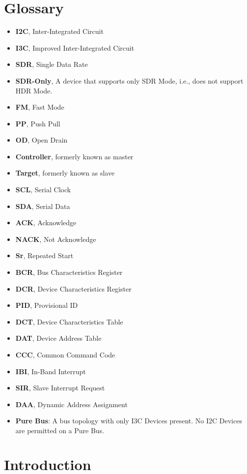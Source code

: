\documentclass[main\_\_EN.tex]{subfiles}
\begin{document}
\section{Glossary}
\setlength{\itemsep}{3pt}
\begin{itemize}
    \item \textbf{I2C}, Inter-Integrated Circuit
    \item \textbf{I3C}, Improved Inter-Integrated Circuit
    \item \textbf{SDR}, Single Data Rate
    \item \textbf{SDR-Only}, A device that supports only SDR Mode, i.e., does not support HDR Mode.
    \item \textbf{FM}, Fast Mode
    \item \textbf{PP}, Push Pull
    \item \textbf{OD}, Open Drain
    \item \textbf{Controller}, formerly known as master
    \item \textbf{Target}, formerly known as slave
    \item \textbf{SCL}, Serial Clock
    \item \textbf{SDA}, Serial Data
    \item \textbf{ACK}, Acknowledge
    \item \textbf{NACK}, Not Acknowledge
    \item \textbf{Sr}, Repeated Start
    \item \textbf{BCR}, Bus Characteristics Register
    \item \textbf{DCR}, Device Characteristics Register
    \item \textbf{PID}, Provisional ID
    \item \textbf{DCT}, Device Characteristics Table
    \item \textbf{DAT}, Device Address Table
    \item \textbf{CCC}, Common Command Code
    \item \textbf{IBI}, In-Band Interrupt
    \item \textbf{SIR}, Slave Interrupt Request
    \item \textbf{DAA}, Dynamic Address Assignment
    \item \textbf{Pure Bus}: A bus topology with only I3C Devices present. No I2C Devices are permitted on a Pure Bus.
\end{itemize}

\section{Introduction}
\end{document}

